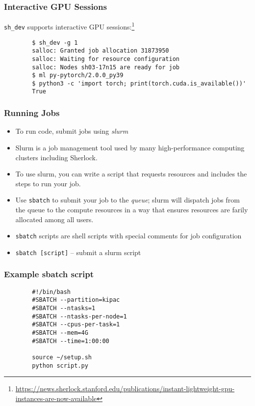 \documentclass[aspectratio=169]{beamer}
\begin{document}
\begin{frame}[fragile]
	\frametitle{Interactive GPU Sessions}
	\texttt{sh\_dev} supports interactive GPU sessions:\footnote{\url{https://news.sherlock.stanford.edu/publications/instant-lightweight-gpu-instances-are-now-available}}
	\begin{verbatim}
		$ sh_dev -g 1 
		salloc: Granted job allocation 31873950
		salloc: Waiting for resource configuration
		salloc: Nodes sh03-17n15 are ready for job
		$ ml py-pytorch/2.0.0_py39
		$ python3 -c 'import torch; print(torch.cuda.is_available())'
		True
	\end{verbatim}
\end{frame}

\begin{frame}
	\frametitle{Running Jobs}
	\begin{itemize}
		\item To run code, submit jobs using \emph{slurm}
		\item Slurm is a job management tool used by many high-performance computing clusters including Sherlock.
		\item To use slurm, you can write a script that requests resources and includes the steps to run your job.
		\item Use \texttt{sbatch} to submit your job to the \emph{queue}; slurm will dispatch jobs from the queue to the compute resources in a way that ensures resources are farily allocated among all users.
		\item \texttt{sbatch} scripts are shell scripts with special comments for job configuration
		\item \texttt{sbatch [script]} -- submit a slurm script
	\end{itemize}
\end{frame}




\begin{frame}[fragile]
	\frametitle{Example sbatch script}
	\begin{verbatim}
		#!/bin/bash
		#SBATCH --partition=kipac
		#SBATCH --ntasks=1
		#SBATCH --ntasks-per-node=1
		#SBATCH --cpus-per-task=1
		#SBATCH --mem=4G
		#SBATCH --time=1:00:00
		
		source ~/setup.sh
		python script.py
	\end{verbatim}
\end{frame}
\end{document}
